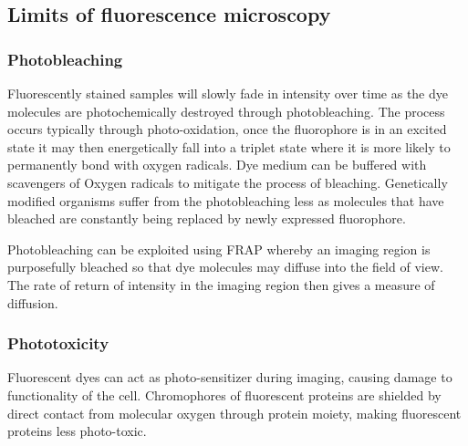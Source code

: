 \subsection{Limits of fluorescence microscopy}


\subsubsection{Photobleaching}

Fluorescently stained samples will slowly fade in intensity over time as the dye molecules are photochemically destroyed through photobleaching.
The process occurs typically through photo-oxidation, once the fluorophore is in an excited state it may then energetically fall into a triplet state where it is more likely to permanently bond with oxygen radicals.
Dye medium can be buffered with scavengers of Oxygen radicals to mitigate the process of bleaching.
Genetically modified organisms suffer from the photobleaching less as molecules that have bleached are constantly being replaced by newly expressed fluorophore.

Photobleaching can be exploited using FRAP whereby an imaging region is purposefully bleached so that dye molecules may diffuse into the field of view.
The rate of return of intensity in the imaging region then gives a measure of diffusion.



\subsubsection{Phototoxicity}

Fluorescent dyes can act as photo-sensitizer during imaging, causing damage to functionality of the cell.
Chromophores of fluorescent proteins are shielded by direct contact from molecular oxygen through protein moiety, making fluorescent proteins less photo-toxic.


